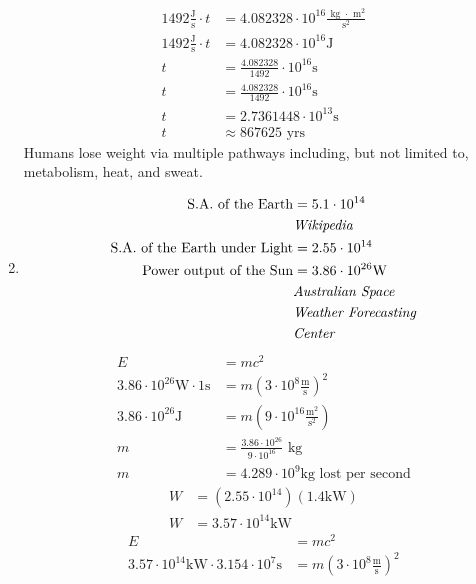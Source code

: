 \documentclass[11pt,letterpaper, twocolumn]{article}
\begin{document}
\begin{enumerate}
\begin{align*}
        1492 \frac{\text{J}}{\text{s}} \cdot t &= 4.082328 \cdot 10^{16} \frac{\text{ kg $\cdot$ m$^2$}}{\text{s$^2$}}\\
        1492 \frac{\text{J}}{\text{s}} \cdot t &= 4.082328 \cdot 10^{16} \text{J}\\
        t &= \frac{4.082328}{1492} \cdot 10^{16} \text{s}\\
        t &= \frac{4.082328}{1492} \cdot 10^{16} \text{s}\\
        t &= 2.7361448 \cdot 10^{13} \text{s}\\
        t &\approx 867625 \text{ yrs}
    \end{align*}
    Humans lose weight via multiple pathways including, but not limited to, metabolism, heat, and sweat. 
    \item \begin{align*}
        \text{S.A. of the Earth} &= 5.1 \cdot 10^{14}\\
        &\text{\textit{Wikipedia}}\\
        \text{S.A. of the Earth under Light} &= 2.55 \cdot 10^{14}\\
        \text{Power output of the Sun} &= 3.86 \cdot 10^{26} \text{W}\\
        &\text{\textit{Australian Space}}\\&\text{\textit{Weather Forecasting}}\\& \text{\textit{Center}}\\
    \end{align*}
    \begin{align*}
        E&= mc^2\\
        3.86 \cdot 10^{26} \text{W} \cdot 1 \text{s} &= m (3\cdot 10^8 \frac{\text{m}}{\text{s}})^2\\
        3.86 \cdot 10^{26} \text{J}&= m (9\cdot 10^{16} \frac{\text{m$^2$}}{\text{s$^2$}})\\
        m &= \frac{3.86 \cdot 10^{26}}{9\cdot 10^{16}} \text{ kg}\\
        m &= 4.289 \cdot 10^9 \text{kg lost per second}
    \end{align*}
    \begin{align*}
        W&= (2.55 \cdot 10^{14})(1.4 \text{kW})\\
        W&= 3.57 \cdot 10^{14} \text{kW}
    \end{align*}
    \begin{align*}
        E&=mc^2\\
        3.57 \cdot 10^{14} \text{kW} \cdot 3.154\cdot 10^7 \text{s} &= m (3\cdot 10^8 \frac{\text{m}}{\text{s}})^2\\

\end{align*}
\end{enumerate}
\end{document}
